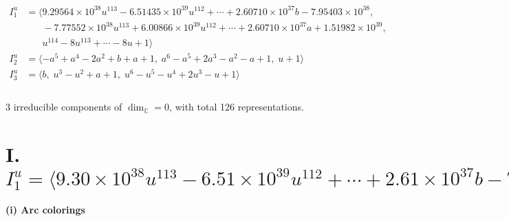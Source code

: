 \documentclass[1p]{elsarticle_modified}
\theoremstyle{definition}
\begin{document}
\begin{align*}
I^u_{1}&=\langle 
9.29564\times10^{38} u^{113}-6.51435\times10^{39} u^{112}+\cdots+2.60710\times10^{37} b-7.95403\times10^{38},\\
\phantom{I^u_{1}}&\phantom{= \langle  }-7.77552\times10^{38} u^{113}+6.00866\times10^{39} u^{112}+\cdots+2.60710\times10^{37} a+1.51982\times10^{39},\\
\phantom{I^u_{1}}&\phantom{= \langle  }u^{114}-8 u^{113}+\cdots-8 u+1\rangle \\
I^u_{2}&=\langle 
- a^5+a^4-2 a^2+b+a+1,\;a^6- a^5+2 a^3- a^2- a+1,\;u+1\rangle \\
I^u_{3}&=\langle 
b,\;u^3- u^2+a+1,\;u^6- u^5- u^4+2 u^3- u+1\rangle \\
\\
\end{align*}
\raggedright * 3 irreducible components of $\dim_{\mathbb{C}}=0$, with total 126 representations.\\
\newpage
\renewcommand{\arraystretch}{1}
\centering \section*{I. $I^u_{1}= \langle 9.30\times10^{38} u^{113}-6.51\times10^{39} u^{112}+\cdots+2.61\times10^{37} b-7.95\times10^{38},\;-7.78\times10^{38} u^{113}+6.01\times10^{39} u^{112}+\cdots+2.61\times10^{37} a+1.52\times10^{39},\;u^{114}-8 u^{113}+\cdots-8 u+1 \rangle$}
\flushleft \textbf{(i) Arc colorings}\\
\end{document}
